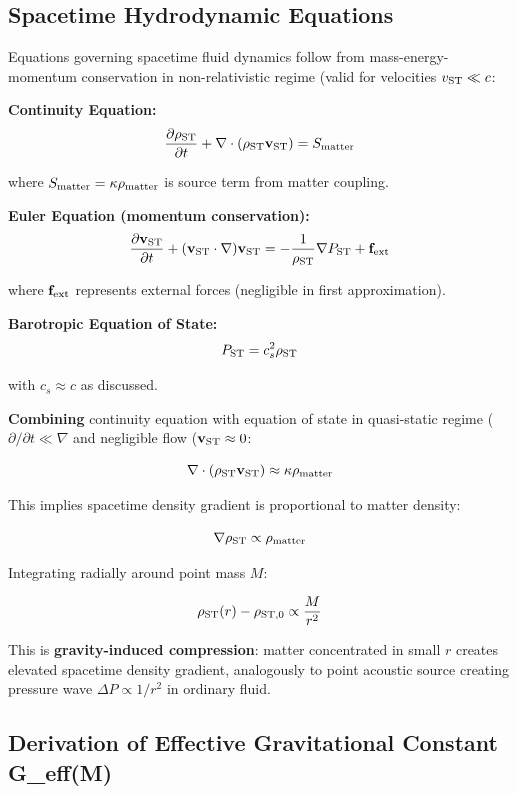 \documentclass[11pt,a4paper]{article}
\begin{document}
\hypertarget{spacetime-hydrodynamic-equations}{%
\subsection{Spacetime Hydrodynamic
Equations}\label{spacetime-hydrodynamic-equations}}

Equations governing spacetime fluid dynamics follow from
mass-energy-momentum conservation in non-relativistic regime (valid for
velocities \(v_{\rm ST} \ll c\):

\textbf{Continuity Equation:}
\[\frac{\partial \rho_{\rm ST}}{\partial t} + \nabla \cdot (\rho_{\rm ST} {\bf v}_{\rm ST}) = S_{\rm matter}\]

where \(S_{\rm matter} = \kappa \rho_{\rm matter}\) is source term from
matter coupling.

\textbf{Euler Equation (momentum conservation):}
\[\frac{\partial {\bf v}_{\rm ST}}{\partial t} + ({\bf v}_{\rm ST} \cdot \nabla) {\bf v}_{\rm ST} = -\frac{1}{\rho_{\rm ST}} \nabla P_{\rm ST} + {\bf f}_{\rm ext}\]

where \({\bf f}_{\rm ext}\) represents external forces (negligible in
first approximation).

\textbf{Barotropic Equation of State:}
\[P_{\rm ST} = c_s^2 \rho_{\rm ST}\]

with \(c_s \approx c\) as discussed.

\textbf{Combining} continuity equation with equation of state in
quasi-static regime (\(\partial/\partial t \ll \nabla\) and negligible
flow (\({\bf v}_{\rm ST} \approx 0\):

\[\nabla \cdot (\rho_{\rm ST} {\bf v}_{\rm ST}) \approx \kappa \rho_{\rm matter}\]

This implies spacetime density gradient is proportional to matter
density:

\[\nabla \rho_{\rm ST} \propto \rho_{\rm matter}\]

Integrating radially around point mass \(M\):

\[\rho_{\rm ST}(r) - \rho_{\rm ST,0} \propto \frac{M}{r^2}\]

This is \textbf{gravity-induced compression}: matter concentrated in
small \(r\) creates elevated spacetime density gradient, analogously to
point acoustic source creating pressure wave \(\Delta P \propto 1/r^2\)
in ordinary fluid.

\hypertarget{derivation-of-effective-gravitational-constant-g_effm}{%
\subsection{Derivation of Effective Gravitational Constant
G\_eff(M)}\label{derivation-of-effective-gravitational-constant-g_effm}}
\end{document}
